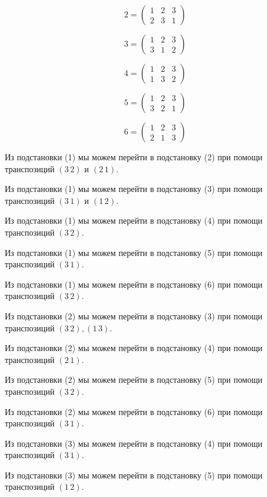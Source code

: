 \documentclass[utf8,14pt,a4paper,oneside,russian]{book}
\begin{document}
	\[ 2 = \left( 
	\begin{array}{ccc}
	1&2&3\\
	2&3&1
	\end{array} 
	\right)\]
	
	\[ 3 = \left( 
	\begin{array}{ccc}
	1&2&3\\
	3&1&2
	\end{array} 
	\right)\]
	
	\[ 4 = \left( 
	\begin{array}{ccc}
	1&2&3\\
	1&3&2
	\end{array} 
	\right)\]
	
	\[ 5 = \left( 
	\begin{array}{ccc}
	1&2&3\\
	3&2&1
	\end{array} 
	\right)\]
	
	\[ 6 = \left( 
	\begin{array}{ccc}
	1&2&3\\
	2&1&3
	\end{array} 
	\right)\]
	
	Из подстановки (1) мы можем перейти в подстановку (2) при помощи транспозиций $(3\,2)$ и $(2\,1)$.
	
	Из подстановки (1) мы можем перейти в подстановку (3) при помощи транспозиций $(3\,1)$ и $(1\,2)$.
	
	Из подстановки (1) мы можем перейти в подстановку (4) при помощи транспозиций $(3\,2)$.
	
	Из подстановки (1) мы можем перейти в подстановку (5) при помощи транспозиций $(3\,1)$.
	
	Из подстановки (1) мы можем перейти в подстановку (6) при помощи транспозиций $(3\,2)$.
	
	Из подстановки (2) мы можем перейти в подстановку (3) при помощи транспозиций $(3\,2),(1\,3)$.
	
	Из подстановки (2) мы можем перейти в подстановку (4) при помощи транспозиций $(2\,1)$.
	
	Из подстановки (2) мы можем перейти в подстановку (5) при помощи транспозиций $(3\,2)$.
	
	Из подстановки (2) мы можем перейти в подстановку (6) при помощи транспозиций $(3\,1)$.
	
	Из подстановки (3) мы можем перейти в подстановку (4) при помощи транспозиций $(3\,1)$.
	
	Из подстановки (3) мы можем перейти в подстановку (5) при помощи транспозиций $(1\,2)$.
	
\end{document}
